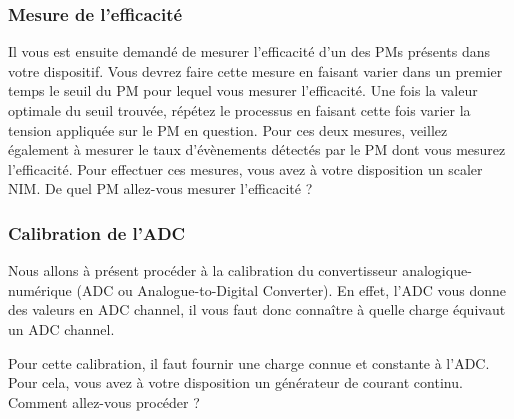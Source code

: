 \subsubsection{Mesure de l'efficacité}

Il vous est ensuite demandé de mesurer l'efficacité d'un des PMs présents dans votre dispositif. Vous devrez faire cette mesure en faisant varier dans un premier temps le seuil du PM pour lequel vous mesurer l'efficacité. Une fois la valeur optimale du seuil trouvée, répétez le processus en faisant cette fois varier la tension appliquée sur le PM en question. Pour ces deux mesures, veillez également à mesurer le taux d'évènements détectés par le PM dont vous mesurez l'efficacité. Pour effectuer ces mesures, vous avez à votre disposition un scaler NIM. De quel PM allez-vous mesurer l'efficacité ?


\subsubsection{Calibration de l'ADC}

Nous allons à présent procéder à la calibration du convertisseur analogique-numérique (ADC ou Analogue-to-Digital Converter). En effet, l'ADC vous donne des valeurs en ADC channel, il vous faut donc connaître à quelle charge équivaut un ADC channel.

Pour cette calibration, il faut fournir une charge connue et constante à l'ADC. Pour cela, vous avez à votre disposition un générateur de courant continu. Comment allez-vous procéder ? 


